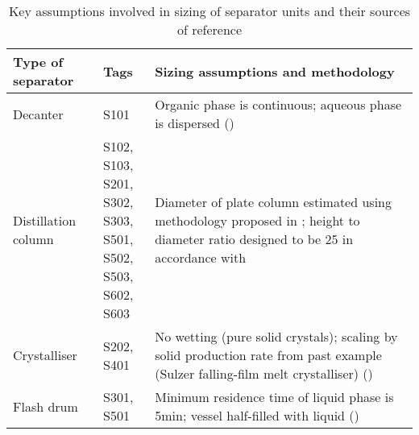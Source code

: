 \begin{table}[h]
\centering
    \caption{Key assumptions involved in sizing of separator units and their sources of reference}
    \label{tab:assumptions of sizing separator units}\footnotesize

\begin{tabularx}{\linewidth}{llX}
\toprule
Type of separator & Tags  & Sizing assumptions and methodology    \\ \midrule
Decanter      & S101  & Organic phase   is continuous; aqueous phase is dispersed    (\textcite{mccabe_unit_2005})  \\ 

Distillation   column   & \splitcell{S102, S103,\\ S201, S302,\\ S303, S501,\\ S502, S503,\\ S602, S603} & Diameter of plate column estimated using methodology proposed in \textcite{seider_product_2009,seader_separation_2011}; height to diameter ratio designed to be 25 in accordance with \textcite{douglas_conceptual_1988} \\ 
Crystalliser & S202, S401    & No wetting   (pure solid crystals); scaling by solid production rate from past example (Sulzer falling-film melt crystalliser)  (\textcite{seader_separation_2011})  \\ 
Flash drum     & S301, S501    & Minimum   residence time of liquid phase is 5min; vessel half-filled with liquid (\textcite{seader_separation_2011}) \\ \bottomrule
\end{tabularx}%

\end{table}

